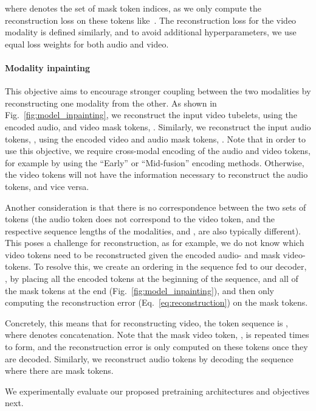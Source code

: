 \documentclass[10pt,twocolumn,letterpaper]{article}
\def \paravspace {-1\baselineskip}
\begin{document}
where  denotes the set of mask token indices, as we only compute the reconstruction loss on these tokens like~\cite{he2022masked,feichtenhofer2022masked,wei2022masked}.
The reconstruction loss for the video modality is defined similarly, and to avoid additional hyperparameters, we use equal loss weights for both audio and video. 

\vspace{\paravspace}
\paragraph{Modality inpainting}
This objective aims to encourage stronger coupling between the two modalities by reconstructing one modality from the other. As shown in Fig.~\ref{fig:model_inpainting}, we reconstruct the input video tubelets,  using the encoded audio,  and video mask tokens, . 
Similarly, we reconstruct the input audio tokens, , using the encoded video  and audio mask tokens, .
Note that in order to use this objective, we require cross-modal encoding of the audio and video tokens, for example by using the ``Early'' or ``Mid-fusion'' encoding methods.
Otherwise, the video tokens will not have the information necessary to reconstruct the audio tokens, and vice versa.



Another consideration is that there is no correspondence between the two sets of tokens (\ie the  audio token does not correspond to the  video token, and the respective sequence lengths of the modalities,  and , are also typically different).
This poses a challenge for reconstruction, as for example, we do not know which video tokens need to be reconstructed given the encoded audio- and mask video-tokens.
To resolve this, we create an ordering in the sequence fed to our decoder, , by placing all the encoded tokens at the beginning of the sequence, and all of the mask tokens at the end (Fig.~\ref{fig:model_inpainting}), and then only computing the reconstruction error (Eq.~\ref{eq:reconstruction}) on the mask tokens.

Concretely, this means that for reconstructing video, the token sequence is , where  denotes concatenation.
Note that the mask video token, , is repeated  times to form,  and the reconstruction error is only computed on these tokens once they are decoded.
Similarly, we reconstruct audio tokens by decoding the sequence  where there are  mask tokens.

We experimentally evaluate our proposed pretraining architectures and objectives next.
\end{document}
